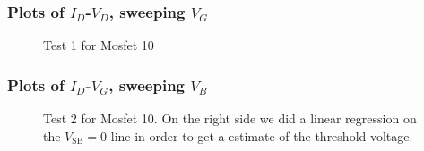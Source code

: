 \documentclass{article}
\begin{document}
\subsubsection{Plots of $I_D$-$V_D$, sweeping $V_G$ }
\begin{figure}[H]
\centering
{}
\caption{Test 1 for Mosfet 10}
\end{figure}

\subsubsection{Plots of $I_D$-$V_G$, sweeping $V_B$}

\begin{figure}[H]
\centering
{}
\caption{Test 2 for Mosfet 10. On the right side we did a linear regression on the $V_{\text{SB}} = 0$ line in order to get a estimate of the threshold voltage.}
\end{figure}
\end{document}
